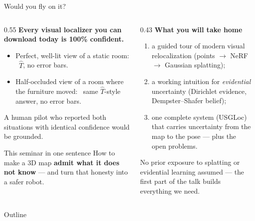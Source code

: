 \documentclass[aspectratio=169,10pt]{beamer}
\newcommand{\method}{USGLoc}
\newcommand{\srcnote}[1]{{\tiny\color{ink!55}#1}}
\begin{document}
\begin{frame}{Would you fly on it?}
  \begin{columns}[T]
    \begin{column}{0.55\textwidth}
      \textbf{Every visual localizer you can download today is 100\%
      confident.}
      \begin{itemize}
        \item Perfect, well-lit view of a static room:
              \ $\hat{T}$, no error bars.
        \item Half-occluded view of a room where the furniture moved:
              \ \alert{same} $\hat{T}$-style answer, no error bars.
      \end{itemize}
      \vspace{2mm}
      A human pilot who reported both situations with identical confidence
      would be grounded.
      \vspace{2mm}
      \begin{block}{This seminar in one sentence}
        How to make a 3D map \textbf{admit what it does not know} --- and
        turn that honesty into a safer robot.
      \end{block}
    \end{column}
    \begin{column}{0.43\textwidth}
      \textbf{What you will take home}
      \begin{enumerate}
        \item a guided tour of modern visual relocalization
              (points $\to$ NeRF $\to$ Gaussian splatting);
        \item a working intuition for \emph{evidential} uncertainty
              (Dirichlet evidence, Dempster--Shafer belief);
        \item one complete system (\method{}) that carries uncertainty
              from the map to the pose --- plus the open problems.
      \end{enumerate}
      \vspace{2mm}
      \srcnote{No prior exposure to splatting or evidential learning
      assumed --- the first part of the talk builds everything we need.}
    \end{column}
  \end{columns}
\end{frame}

\begin{frame}{Outline}
  \tableofcontents
\end{frame}
\end{document}
